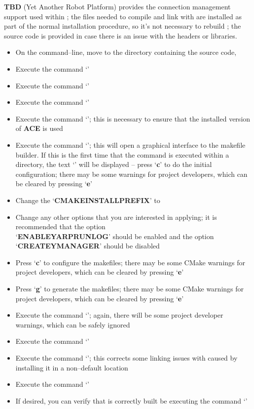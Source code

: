 \tertiaryEnd{}
\textbf{TBD}
\tertiaryEnd{}
\secondaryEnd{}
\textbf{\yarp} (Yet Another Robot Platform) provides the connection management support
used within \mplusm{}; the files needed to compile and link with \yarp{} are installed as
part of the normal \mplusm{} installation procedure, so it's not necessary to rebuild
\yarp{}; the source code is provided in case there is an issue with the headers or
libraries.
\begin{itemize}
\item On the command--line, move to the directory containing the \mplusm{} source code,
\item Execute the command `'
\item Execute the command `'
\item Execute the command `'
\item Execute the command `'; this is necessary to ensure that
the installed version of \textbf{ACE} is used
\item Execute the command `'; this will open a graphical interface to the
makefile builder. If this is the first time that the command is executed within a
directory, the text `' will be displayed -- press `\textbf{c}' to do
the initial configuration; there may be some warnings for project developers, which can be
cleared by pressing `\textbf{e}'
\item Change the `\textbf{CMAKE\fUS{}INSTALL\fUS{}PREFIX}' to 
\item Change any other options that you are interested in applying; it is recommended that
the option\\
`\textbf{ENABLE\fUS{}YARPRUN\fUS{}LOG}' should be enabled and the option
`\textbf{CREATE\fUS{}YMANAGER}' should be disabled
\item Press `\textbf{c}' to configure the makefiles; there may be some CMake warnings for
project developers, which can be cleared by pressing `\textbf{e}'
\item Press `\textbf{g}' to generate the makefiles; there may be some CMake warnings for
project developers, which can be cleared by pressing `\textbf{e}'
\item Execute the command `'; again, there will be some project developer
warnings, which can be safely ignored
\item Execute the command `'
\item Execute the command `'; this corrects some linking
issues with \yarp{} caused by installing it in a non--default location
\item Execute the command `'
\item If desired, you can verify that \yarp{} is correctly built be executing the command
`'
\end{itemize}
